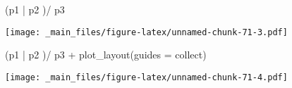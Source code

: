 \documentclass[
]{book}
\newenvironment{Shaded}{\begin{snugshade}}{\end{snugshade}}
\newcommand{\AttributeTok}[1]{\textcolor[rgb]{0.77,0.63,0.00}{#1}}
\newcommand{\FunctionTok}[1]{\textcolor[rgb]{0.00,0.00,0.00}{#1}}
\newcommand{\NormalTok}[1]{#1}
\newcommand{\SpecialCharTok}[1]{\textcolor[rgb]{0.00,0.00,0.00}{#1}}
\newcommand{\StringTok}[1]{\textcolor[rgb]{0.31,0.60,0.02}{#1}}
\begin{document}
\begin{Shaded}
\begin{Highlighting}[]
\NormalTok{(p1 }\SpecialCharTok{|}\NormalTok{ p2 )}\SpecialCharTok{/}\NormalTok{ p3}
\end{Highlighting}
\end{Shaded}

\texttt{[image: \_main\_files/figure-latex/unnamed-chunk-71-3.pdf]}

\begin{Shaded}
\begin{Highlighting}[]
\NormalTok{(p1 }\SpecialCharTok{|}\NormalTok{ p2 )}\SpecialCharTok{/}\NormalTok{ p3 }\SpecialCharTok{+} \FunctionTok{plot\_layout}\NormalTok{(}\AttributeTok{guides =} \StringTok{\textquotesingle{}collect\textquotesingle{}}\NormalTok{)}
\end{Highlighting}
\end{Shaded}

\texttt{[image: \_main\_files/figure-latex/unnamed-chunk-71-4.pdf]}
\end{document}
